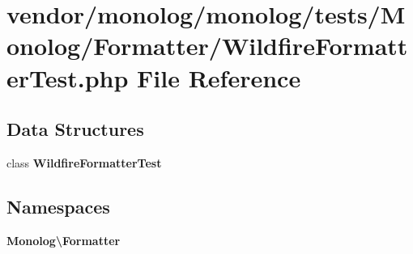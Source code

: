 \section{vendor/monolog/monolog/tests/\+Monolog/\+Formatter/\+Wildfire\+Formatter\+Test.php File Reference}
\label{_wildfire_formatter_test_8php}
\subsection*{Data Structures}
\begin{DoxyCompactItemize}
\item 
class {\bf Wildfire\+Formatter\+Test}
\end{DoxyCompactItemize}
\subsection*{Namespaces}
\begin{DoxyCompactItemize}
\item 
 {\bf Monolog\textbackslash{}\+Formatter}
\end{DoxyCompactItemize}
